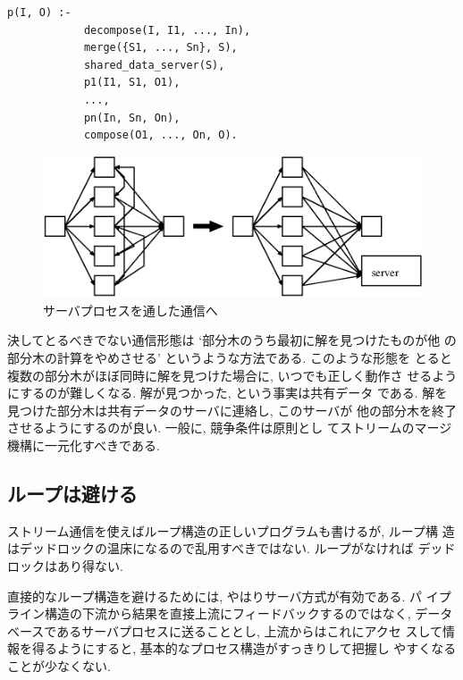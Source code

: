 \documentclass[a4,titlepage]{jsreport}
\newenvironment{program}{\begin{quote}}{\end{quote}}
\begin{document}
\begin{Verbatim}[baselinestretch=0.8]
        p(I, O) :-
            decompose(I, I1, ..., In),
            merge({S1, ..., Sn}, S),
            shared_data_server(S),
            p1(I1, S1, O1),
            ...,
            pn(In, Sn, On),
            compose(O1, ..., On, O).
\end{Verbatim}

\begin{figure}
\begin{center}
\includegraphics{fig/server.eps}
\caption{サーバプロセスを通した通信へ}
\label{server}
\end{center}
\end{figure}

決してとるべきでない通信形態は `部分木のうち最初に解を見つけたものが他
の部分木の計算をやめさせる' というような方法である.  このような形態を
とると複数の部分木がほぼ同時に解を見つけた場合に, いつでも正しく動作さ
せるようにするのが難しくなる.  解が見つかった, という事実は共有データ
である.  解を見つけた部分木は共有データのサーバに連絡し, このサーバが
他の部分木を終了させるようにするのが良い.  一般に, 競争条件は原則とし
てストリームのマージ機構に一元化すべきである.  

\subsection{ループは避ける}
ストリーム通信を使えばループ構造の正しいプログラムも書けるが, ループ構
造はデッドロックの温床になるので乱用すべきではない.  ループがなければ
デッドロックはあり得ない.  

直接的なループ構造を避けるためには, やはりサーバ方式が有効である.  パ
イプライン構造の下流から結果を直接上流にフィードバックするのではなく,  
データベースであるサーバプロセスに送ることとし, 上流からはこれにアクセ
スして情報を得るようにすると, 基本的なプロセス構造がすっきりして把握し
やすくなることが少なくない.  
\end{document}
